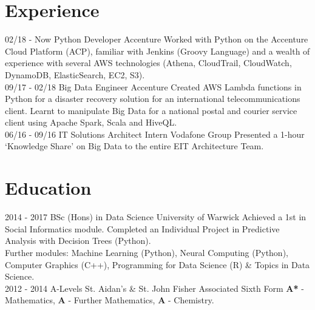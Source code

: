 \documentclass[]{friggeri-cv}
\begin{document}
\section{Experience}
\begin{entrylist}
    \entry
    {02/18 - Now}
    {Python Developer}
    {Accenture}
    {Worked with Python on the Accenture Cloud Platform (ACP), familiar with Jenkins (Groovy Language) and a wealth of experience with several AWS technologies (Athena, CloudTrail, CloudWatch, DynamoDB, ElasticSearch, EC2, S3).\\
    }
    \entry
    {09/17 - 02/18}
    {Big Data Engineer}
    {Accenture}
    {Created AWS Lambda functions in Python for a disaster recovery solution for an international telecommunications client. Learnt to manipulate Big Data for a national postal and courier service client using Apache Spark, Scala and HiveQL.\\
    }
    \entry
    {06/16 - 09/16}
    {IT Solutions Architect Intern}
    {Vodafone Group}
    {Presented a 1-hour ‘Knowledge Share’ on Big Data to the entire EIT Architecture Team.}
\end{entrylist}

\section{Education}
\begin{entrylist}
  \entry %
    {2014 - 2017}
    {BSc (Hons) in Data Science}
    {University of Warwick}
    {Achieved a 1st in Social Informatics module. Completed an Individual Project in Predictive Analysis with Decision Trees (Python).\\
    
    Further modules: Machine Learning (Python), Neural Computing (Python), Computer Graphics (C++), Programming for Data Science (R) \& Topics in Data Science.\\}
  \entry %
    {2012 - 2014}
    {A-Levels}
    {St. Aidan's \& St. John Fisher Associated Sixth Form}
    {\textbf{A*} - Mathematics, \textbf{A} - Further Mathematics, \textbf{A} - Chemistry.}
\end{entrylist}
\end{document}
